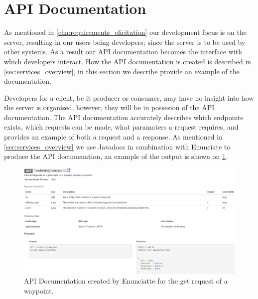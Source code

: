\section{API Documentation}\label{sec:api_documentation}
As mentioned in \cref{cha:requirements_elicitation} our development focus is on the server, resulting in our users being developers; since the server is to be used by other systems.
As a result our API documentation becomes the interface with which developers interact.
How the API documentation is created is described in \cref{sec:services_overview}, in this section we describe provide an example of the documentation.

\bigskip
Developers for a client, be it producer or consumer, may have no insight into how the server is organised, however, they will be in possesion of the API documentation.
The API documentation accurately describes which endpoints exists, which requests can be made, what paramaters a request requires, and provides an example of both a request and a response.
As mentioned in \cref{sec:services_overview} we use Javadocs in combination with Enunciate to produce the API documenation, an example of the output is shown on \cref{fig:enunciate_example}.

\begin{figure}[!htb]
    \centering
    \includegraphics[width=1\textwidth]{img/cuckcuckcuckcuck.png}
    \caption{API Documentation created by Enunciatte for the get request of a waypoint.}
    \label{fig:enunciate_example}
\end{figure}
